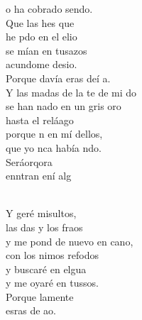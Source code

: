 \begin{cancion}
	o ha cobrado sendo.\\
	Que las hes que \\
	he pdo en el elio\\
	se mían en tusazos\\
	acundome desio. \\
	Porque davía eras deí a.\\
\jump
	Y las madas de la te de mi do\\
	se han nado en un gris oro\\
	hasta el reláago\\
	porque n en mí dellos,\\
	que yo nca había ndo.\\
	Seráorqora \\
	enntran ení alg\\\jump\\
	\begin{chorus}%
	Y geré misultos,\\
	las das y los fraos\\
	y me pond de nuevo en cano, \\
	con los nimos refodos\\
	y  buscaré en elgua\\
	y me oyaré en tussos.\\
	Porque lamente   \\
	esras de  ao.\\
	\end{chorus}%
	\jump\\
\end{cancion}%
